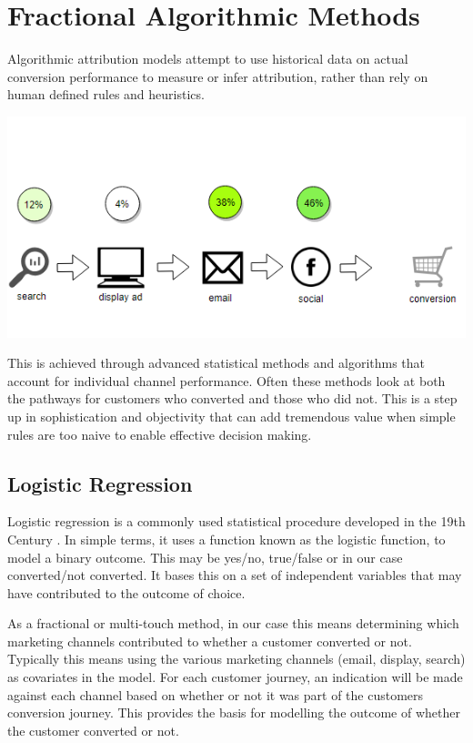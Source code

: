 \documentclass[]{book}
\begin{document}
\section{Fractional Algorithmic
Methods}\label{fractional-algorithmic-methods}

Algorithmic attribution models attempt to use historical data on actual
conversion performance to measure or infer attribution, rather than rely
on human defined rules and heuristics.

\includegraphics[width=5.67in]{img/fractional}

This is achieved through advanced statistical methods and algorithms
that account for individual channel performance. Often these methods
look at both the pathways for customers who converted and those who did
not. This is a step up in sophistication and objectivity that can add
tremendous value when simple rules are too naive to enable effective
decision making.

\subsection{Logistic Regression}\label{logistic-regression}

Logistic regression is a commonly used statistical procedure developed
in the 19th Century \citep{cramer2002origins}. In simple terms, it uses
a function known as the logistic function, to model a binary outcome.
This may be yes/no, true/false or in our case converted/not converted.
It bases this on a set of independent variables that may have
contributed to the outcome of choice.

As a fractional or multi-touch method, in our case this means
determining which marketing channels contributed to whether a customer
converted or not. Typically this means using the various marketing
channels (email, display, search) as covariates in the model. For each
customer journey, an indication will be made against each channel based
on whether or not it was part of the customers conversion journey. This
provides the basis for modelling the outcome of whether the customer
converted or not.
\end{document}
